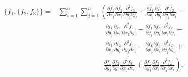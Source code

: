 \newpage

\begin{align}\begin{split}
    \{f_1, \{f_2, f_3\}\}
    = &\sum_{i=1}^{n} \sum_{j=1}^{n} \left(
        \frac{\partial f_1}{\partial x_j}
        \frac{\partial f_2}{\partial x_i}
        \frac{\partial^2 f_3}{\partial y_j \partial y_i} +
        \frac{\partial f_1}{\partial x_j}
        \frac{\partial f_3}{\partial y_i}
        \frac{\partial^2 f_2}{\partial y_j \partial x_i} - \right.\\
        &\phantom{\sum_{i=1}^{n} \sum_{j=1}^{n}}\ \ \ 
        \frac{\partial f_1}{\partial y_j}
        \frac{\partial f_2}{\partial x_i}
        \frac{\partial^2 f_3}{\partial x_j \partial y_i} - 
        \frac{\partial f_1}{\partial y_j}
        \frac{\partial f_3}{\partial y_i}
        \frac{\partial^2 f_2}{\partial x_j \partial y_i} - \\
        &\phantom{\sum_{i=1}^{n} \sum_{j=1}^{n}}\ \ \ 
        \frac{\partial f_1}{\partial x_j}
        \frac{\partial f_2}{\partial y_i}
        \frac{\partial^2 f_3}{\partial y_j \partial x_i} -
        \frac{\partial f_1}{\partial x_j}
        \frac{\partial f_3}{\partial x_i}
        \frac{\partial^2 f_2}{\partial y_j \partial y_i} + \\
        &\phantom{\sum_{i=1}^{n} \sum_{j=1}^{n}}\ \ \left.
        \frac{\partial f_1}{\partial y_j}
        \frac{\partial f_2}{\partial y_i}
        \frac{\partial^2 f_3}{\partial x_j \partial x_i} +
        \frac{\partial f_1}{\partial y_j}
        \frac{\partial f_3}{\partial x_i}
        \frac{\partial^2 f_2}{\partial x_j \partial x_i}
    \right),
\end{split}\end{align}

